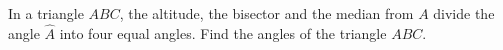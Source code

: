 In a triangle $ABC$, the altitude, the bisector and the median from $A$ divide the angle $\hat{A}$ into four equal angles. Find the angles of the triangle $ABC$.
